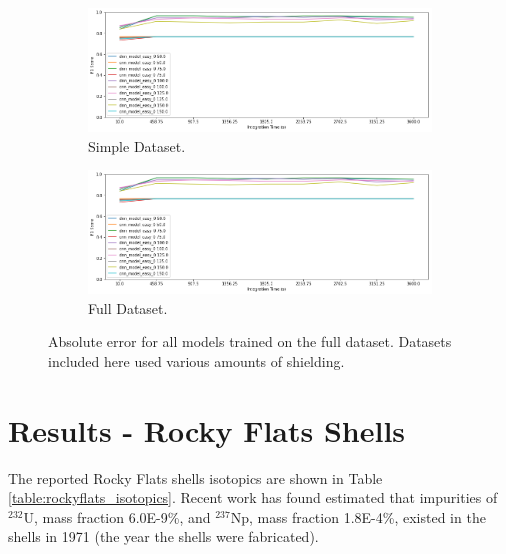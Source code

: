 \begin{figure}[H]
     \centering
     \begin{subfigure}[b]{0.9\textwidth}
         \centering
         \includegraphics[width=\textwidth]{images/results_easy_distance_comparison}
         \caption{Simple Dataset.}
         \label{fig:results_full_background_inject_simple}
     \end{subfigure}

     \begin{subfigure}[b]{0.9\textwidth}
         \centering
         \includegraphics[width=\textwidth]{images/results_easy_distance_comparison}
         \caption{Full Dataset.}
         \label{fig:results_full_background_inject_full}
     \end{subfigure}
        \caption{Absolute error for all models trained on the full dataset. Datasets included here used various amounts of shielding.}
        \label{fig:results_full_background_inject}
\end{figure}






\section{Results - Rocky Flats Shells}



The reported Rocky Flats shells isotopics are shown in Table \ref{table:rockyflats_isotopics}. Recent work has found estimated that impurities of $^{232}$U, mass fraction 6.0E-9\%, and $^{237}$Np, mass fraction 1.8E-4\%, \cite{RawoolSullivan2012} existed in the shells in 1971 (the year the shells were fabricated).

